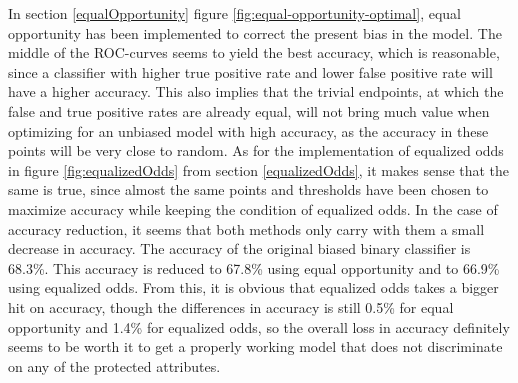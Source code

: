 \documentclass[11pt, fleqn, titlepage]{article}
\begin{document}
	In section \ref{equalOpportunity} figure \ref{fig:equal-opportunity-optimal}, equal opportunity has been implemented to correct the present bias in the model. The middle of the ROC-curves seems to yield the best accuracy, which is reasonable, since a classifier with higher true positive rate and lower false positive rate will have a higher accuracy. This also implies that the trivial endpoints, at which the false and true positive rates are already equal, will not bring much value when optimizing for an unbiased model with high accuracy, as the accuracy in these points will be very close to random. As for the implementation of equalized odds in figure \ref{fig:equalizedOdds} from section \ref{equalizedOdds}, it makes sense that the same is true, since almost the same points and thresholds have been chosen to maximize accuracy while keeping the condition of equalized odds. In the case of accuracy reduction, it seems that both methods only carry with them a small decrease in accuracy. The accuracy of the original biased binary classifier is 68.3\%. This accuracy is reduced to 67.8\% using equal opportunity and to 66.9\% using equalized odds. From this, it is obvious that equalized odds takes a bigger hit on accuracy, though the differences in accuracy is still 0.5\% for equal opportunity and 1.4\% for equalized odds, so the overall loss in accuracy definitely seems to be worth it to get a properly working model that does not discriminate on any of the protected attributes.
	
\end{document}
